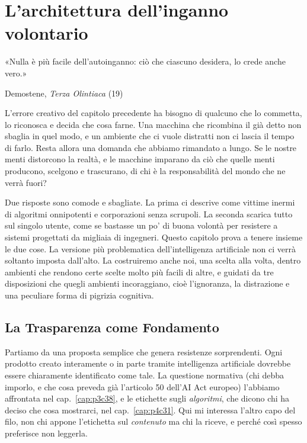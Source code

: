 \chapter{L'architettura dell'inganno volontario}
\label{cap:p4c41}

\epigraph{«Nulla è più facile dell'autoinganno: ciò che ciascuno desidera, lo crede anche vero.»}{Demostene, \textit{Terza Olintiaca} (19)}

L'errore creativo del capitolo precedente ha bisogno di qualcuno che lo commetta, lo riconosca e decida che cosa farne. Una macchina che ricombina il già detto non sbaglia in quel modo, e un ambiente che ci vuole distratti non ci lascia il tempo di farlo. Resta allora una domanda che abbiamo rimandato a lungo. Se le nostre menti distorcono la realtà, e le macchine imparano da ciò che quelle menti producono, scelgono e trascurano, di chi è la responsabilità del mondo che ne verrà fuori?

Due risposte sono comode e sbagliate. La prima ci descrive come vittime inermi di algoritmi onnipotenti e corporazioni senza scrupoli. La seconda scarica tutto sul singolo utente, come se bastasse un po' di buona volontà per resistere a sistemi progettati da migliaia di ingegneri. Questo capitolo prova a tenere insieme le due cose. La versione più problematica dell'intelligenza artificiale non ci verrà soltanto imposta dall'alto. La costruiremo anche noi, una scelta alla volta, dentro ambienti che rendono certe scelte molto più facili di altre, e guidati da tre disposizioni che quegli ambienti incoraggiano, cioè l'ignoranza, la distrazione e una peculiare forma di pigrizia cognitiva.

\section{La Trasparenza come Fondamento}

Partiamo da una proposta semplice che genera resistenze sorprendenti. Ogni prodotto creato interamente o in parte tramite intelligenza artificiale dovrebbe essere chiaramente identificato come tale. La questione normativa (chi debba imporlo, e che cosa preveda già l'articolo 50 dell'AI Act europeo) l'abbiamo affrontata nel cap.~\ref{cap:p3c38}, e le etichette sugli \textit{algoritmi}, che dicono chi ha deciso che cosa mostrarci, nel cap.~\ref{cap:p4c31}. Qui mi interessa l'altro capo del filo, non chi appone l'etichetta sul \textit{contenuto} ma chi la riceve, e perché così spesso preferisce non leggerla.

